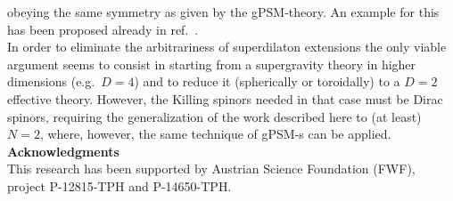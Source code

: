 \documentclass[a4paper,10pt]{article}
\renewcommand{\^}{{}^}
\renewcommand{\_}{\!{}_}
\begin{document}
obeying the same symmetry as given by the gPSM-theory. An 
example for this has been proposed already in ref.\  
\cite{Izquierdo:1998hg}. \\
In order to eliminate the arbitrariness of superdilaton 
extensions the only viable argument seems to consist in 
starting from a supergravity theory in higher dimensions 
(e.g.\ $D=4$) and to reduce it (spherically or  toroidally)  
 to a $D=2$ effective theory. However, the Killing spinors 
needed in that case must be Dirac spinors, requiring the 
generalization of the work \cite{EKS,Ertl:Diss} 
described here to (at least) 
$N=2$, where, however, the same technique of gPSM-s can  
be applied. \\[1.5cm]
\noindent
{\large\bf Acknowledgments}
\\[0.5cm]
This research has been supported by Austrian Science 
Foundation (FWF), project P-12815-TPH and P-14650-TPH. 
\end{document}
